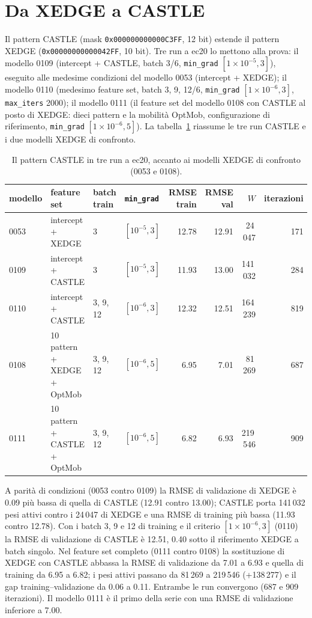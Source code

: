 \section{Da XEDGE a CASTLE}

Il pattern CASTLE (mask \texttt{0x000000000000C3FF}, 12 bit)
estende il pattern XEDGE
(\texttt{0x00000000000042FF}, 10 bit). Tre run a ec20 lo
mettono alla prova: il modello 0109 (intercept + CASTLE, batch
3/6, \texttt{min\_grad} $[1\times10^{-5}, 3]$), eseguito alle
medesime condizioni del modello 0053 (intercept + XEDGE); il
modello 0110 (medesimo feature set, batch 3, 9, 12/6,
\texttt{min\_grad} $[1\times10^{-6}, 3]$, \texttt{max\_iters}
2000); il modello 0111 (il feature set del modello 0108 con
CASTLE al posto di XEDGE: dieci pattern e la mobilità OptMob,
configurazione di riferimento, \texttt{min\_grad}
$[1\times10^{-6}, 5]$). La tabella~\ref{tab:castle} riassume le
tre run CASTLE e i due modelli XEDGE di confronto.

\begin{table}[ht]
\centering
\small
\begin{tabular}{llllrrrr}
\toprule
modello & feature set & batch train & \texttt{min\_grad} & RMSE train & RMSE val & $W$ & iterazioni \\
\midrule
0053 & intercept + XEDGE & 3 & $[10^{-5}, 3]$ & 12.78 & 12.91 & 24\,047 & 171 \\
0109 & intercept + CASTLE & 3 & $[10^{-5}, 3]$ & 11.93 & 13.00 & 141\,032 & 284 \\
0110 & intercept + CASTLE & 3, 9, 12 & $[10^{-6}, 3]$ & 12.32 & 12.51 & 164\,239 & 819 \\
0108 & 10 pattern + XEDGE + OptMob & 3, 9, 12 & $[10^{-6}, 5]$ & 6.95 & 7.01 & 81\,269 & 687 \\
0111 & 10 pattern + CASTLE + OptMob & 3, 9, 12 & $[10^{-6}, 5]$ & 6.82 & 6.93 & 219\,546 & 909 \\
\bottomrule
\end{tabular}
\caption{Il pattern CASTLE in tre run a ec20, accanto ai modelli
XEDGE di confronto (0053 e 0108).}
\label{tab:castle}
\end{table}

A parità di condizioni (0053 contro 0109) la RMSE di validazione
di XEDGE è 0.09 più bassa di quella di CASTLE (12.91 contro
13.00); CASTLE porta 141\,032 pesi attivi contro i 24\,047 di
XEDGE e una RMSE di training più bassa (11.93 contro 12.78). Con
i batch 3, 9 e 12 di training e il criterio
$[1\times10^{-6}, 3]$ (0110) la RMSE di validazione di CASTLE è
12.51, 0.40 sotto il riferimento XEDGE a batch singolo. Nel
feature set completo (0111 contro 0108) la sostituzione di
XEDGE con CASTLE abbassa la RMSE di validazione da 7.01 a 6.93
e quella di training da 6.95 a 6.82; i pesi attivi passano da
81\,269 a 219\,546 (+138\,277) e il gap training--validazione da
0.06 a 0.11. Entrambe le run convergono (687 e 909
iterazioni). Il modello 0111 è il primo della serie con una RMSE
di validazione inferiore a 7.00.

